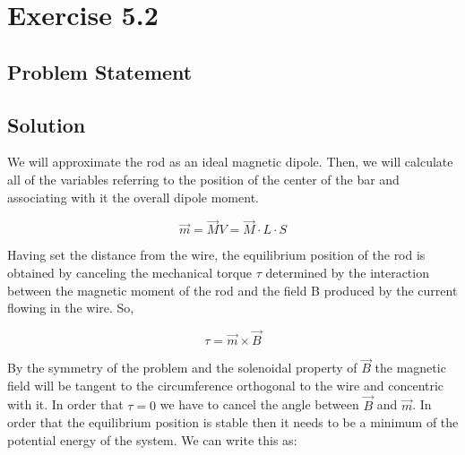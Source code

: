 \section*{Exercise 5.2}
\subsection*{Problem Statement}
\hfill
\begin{center}
\end{center}

\subsection*{Solution}

We will approximate the rod as an ideal magnetic dipole. Then, we will calculate
all of the variables referring to the position of the center of the bar and
associating with it the overall dipole moment.

\[ 
    \vec{m} = \vec{M} V = \vec{M} \cdot L \cdot S 
\]

Having set the distance from the wire, the equilibrium position of the rod is
obtained by canceling the mechanical torque $\tau$ determined by the
interaction between the magnetic moment of the rod and the field B produced by
the current flowing in the wire. So,

\[ 
    \tau = \vec{m}\times \vec{B} 
\]

By the symmetry of the problem and the solenoidal property of $\vec{B}$ the
magnetic field will be tangent to the circumference orthogonal to the wire and
concentric with it. In order that $\tau = 0$ we have to cancel the angle between
$\vec{B}$ and $\vec{m}$. In order that the equilibrium position is stable then
it needs to be a minimum of the potential energy of the system. We can write
this as:

